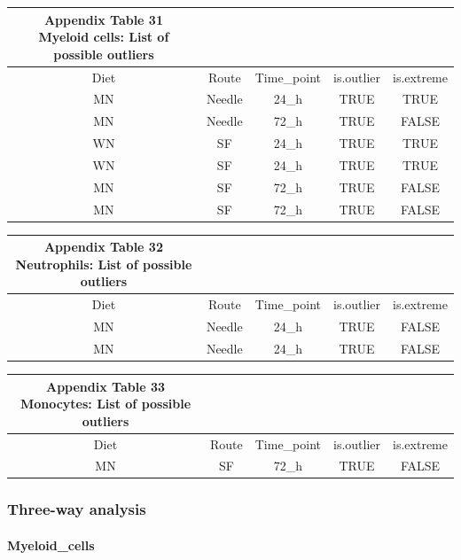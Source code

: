 \documentclass[
  12pt,
  letterpaper,
]{article}
\begin{document}
\begin{longtable}{ccccc}
\caption*{
{\large \textbf{Appendix Table 31}} \\ 
{\small \textbf{Myeloid cells: List of possible outliers}}
} \\ 
\toprule
Diet & Route & Time\_point & is.outlier & is.extreme \\ 
\midrule\addlinespace[2.5pt]
MN & Needle & 24\_h & TRUE & TRUE \\ 
MN & Needle & 72\_h & TRUE & FALSE \\ 
WN & SF & 24\_h & TRUE & TRUE \\ 
WN & SF & 24\_h & TRUE & TRUE \\ 
MN & SF & 72\_h & TRUE & FALSE \\ 
MN & SF & 72\_h & TRUE & FALSE \\ 
\bottomrule
\end{longtable}

\begin{longtable}{ccccc}
\caption*{
{\large \textbf{Appendix Table 32}} \\ 
{\small \textbf{Neutrophils: List of possible outliers}}
} \\ 
\toprule
Diet & Route & Time\_point & is.outlier & is.extreme \\ 
\midrule\addlinespace[2.5pt]
MN & Needle & 24\_h & TRUE & FALSE \\ 
MN & Needle & 24\_h & TRUE & FALSE \\ 
\bottomrule
\end{longtable}

\begin{longtable}{ccccc}
\caption*{
{\large \textbf{Appendix Table 33}} \\ 
{\small \textbf{Monocytes: List of possible outliers}}
} \\ 
\toprule
Diet & Route & Time\_point & is.outlier & is.extreme \\ 
\midrule\addlinespace[2.5pt]
MN & SF & 72\_h & TRUE & FALSE \\ 
\bottomrule
\end{longtable}

\subsubsection{Three-way analysis}\label{three-way-analysis-1}

\paragraph{Myeloid\_cells}\label{myeloid_cells-3}
\end{document}
